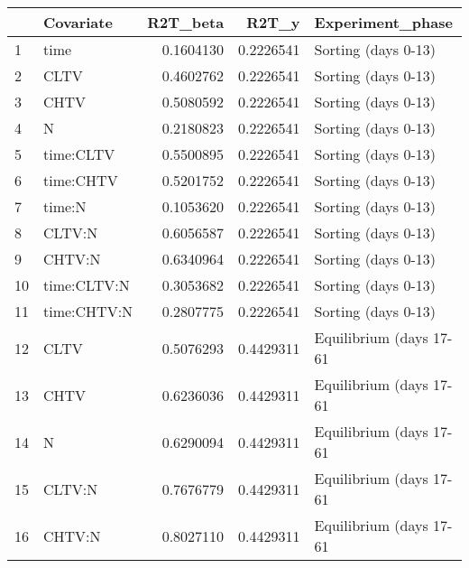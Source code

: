 \begin{table}[ht]
\centering
\begin{tabular}{llrrl}
  \hline
 & Covariate & R2T\_beta & R2T\_y & Experiment\_phase \\ 
  \hline
1 & time & 0.1604130 & 0.2226541 & Sorting (days 0-13) \\ 
  2 & CLTV & 0.4602762 & 0.2226541 & Sorting (days 0-13) \\ 
  3 & CHTV & 0.5080592 & 0.2226541 & Sorting (days 0-13) \\ 
  4 & N & 0.2180823 & 0.2226541 & Sorting (days 0-13) \\ 
  5 & time:CLTV & 0.5500895 & 0.2226541 & Sorting (days 0-13) \\ 
  6 & time:CHTV & 0.5201752 & 0.2226541 & Sorting (days 0-13) \\ 
  7 & time:N & 0.1053620 & 0.2226541 & Sorting (days 0-13) \\ 
  8 & CLTV:N & 0.6056587 & 0.2226541 & Sorting (days 0-13) \\ 
  9 & CHTV:N & 0.6340964 & 0.2226541 & Sorting (days 0-13) \\ 
  10 & time:CLTV:N & 0.3053682 & 0.2226541 & Sorting (days 0-13) \\ 
  11 & time:CHTV:N & 0.2807775 & 0.2226541 & Sorting (days 0-13) \\ 
  12 & CLTV & 0.5076293 & 0.4429311 & Equilibrium (days 17-61 \\ 
  13 & CHTV & 0.6236036 & 0.4429311 & Equilibrium (days 17-61 \\ 
  14 & N & 0.6290094 & 0.4429311 & Equilibrium (days 17-61 \\ 
  15 & CLTV:N & 0.7676779 & 0.4429311 & Equilibrium (days 17-61 \\ 
  16 & CHTV:N & 0.8027110 & 0.4429311 & Equilibrium (days 17-61 \\ 
   \hline
\end{tabular}
\end{table}

